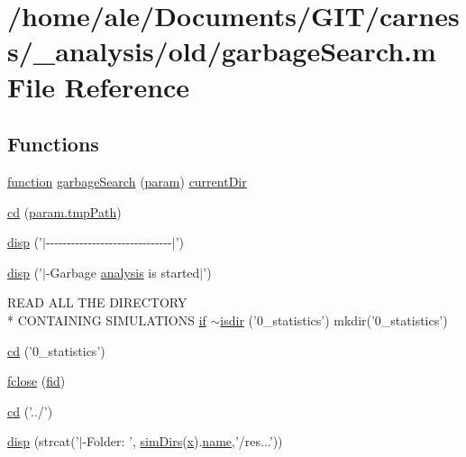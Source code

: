\hypertarget{a00021}{\section{/home/ale/\-Documents/\-G\-I\-T/carness/\-\_\-analysis/old/garbage\-Search.m File Reference}
\label{a00021}
}
\subsection*{Functions}
\begin{DoxyCompactItemize}
\item 
\hyperlink{a00062_a4b4c670b101bf7a838f775e008fa6255}{function} \hyperlink{a00021_a8d69772ffb168fa3e492dce8d97511e7}{garbage\-Search} (\hyperlink{a00027_a51f20d6b1b54a2eee3be0e8adc96a0ae}{param}) \hyperlink{a00025_af32eb97339f1e9d37b5540de2cbc79c9}{current\-Dir}
\item 
\hyperlink{a00021_a452d57b5eb20c3e594ee8ee53155fdd9}{cd} (\hyperlink{a00026_a1e5a4863ab2b87f923e1d19e2da1f5ac}{param.\-tmp\-Path})
\item 
\hyperlink{a00021_a42239b4891be578ad871fbcf3c713a59}{disp} ('$|$-\/-\/-\/-\/-\/-\/-\/-\/-\/-\/-\/-\/-\/-\/-\/-\/-\/-\/-\/-\/-\/-\/-\/-\/-\/-\/-\/-\/-\/-\/$|$')
\item 
\hyperlink{a00021_a9024ba22a46088871be1d4ea6750fa54}{disp} ('$|$-\/Garbage \hyperlink{a00026_abf6e5638a23a2531114655f3f690b70c}{analysis} is started$|$')
\item 
R\-E\-A\-D A\-L\-L T\-H\-E D\-I\-R\-E\-C\-T\-O\-R\-Y \\*
C\-O\-N\-T\-A\-I\-N\-I\-N\-G S\-I\-M\-U\-L\-A\-T\-I\-O\-N\-S \hyperlink{a00024_a01d55766b8058903dd360b4bda71f9f5}{if} \hyperlink{a00021_aef429e9a25e0d4d70aa2037a59816956}{$\sim$isdir} ('0\-\_\-statistics') mkdir('0\-\_\-statistics')
\item 
\hyperlink{a00021_a365d011aeb5adcedc5cc75e7df629a6f}{cd} ('0\-\_\-statistics')
\item 
\hyperlink{a00021_a5e769bbbabcaddc548203741c7100228}{fclose} (\hyperlink{a00025_ae9011d40c6f13e68e6f07156e0da7c5d}{fid})
\item 
\hyperlink{a00021_a7eb00a69197e8905221801683c7ec02a}{cd} ('../')
\item 
\hyperlink{a00021_a609f02c862f2843febf3408f688be8e8}{disp} (strcat('$|$-\/Folder\-: ', \hyperlink{a00025_aae5035eb84b89176ed5b06e136325eff}{sim\-Dirs}(\hyperlink{a00025_a7265972fe485274cfff77a9bb07b8fce}{x}).\hyperlink{a00021_abbf559a76fab59203496b0847ab9502a}{name},'/res...'))

\end{DoxyCompactItemize}
